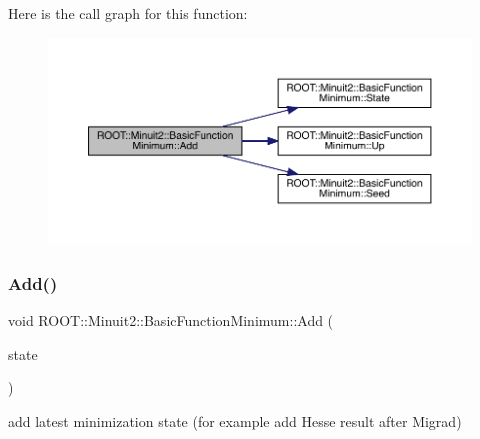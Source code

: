 Here is the call graph for this function\+:
\nopagebreak
\begin{figure}[H]
\begin{center}
\leavevmode
\includegraphics[width=350pt]{de/d25/classROOT_1_1Minuit2_1_1BasicFunctionMinimum_abd32f932e7a26883723b33c4a1402a85_cgraph}
\end{center}
\end{figure}
\mbox{\label{classROOT_1_1Minuit2_1_1BasicFunctionMinimum_abd32f932e7a26883723b33c4a1402a85}} 
\subsubsection{\texorpdfstring{Add()}{Add()}\hspace{0.1cm}{\footnotesize\ttfamily [3/3]}}
{\footnotesize\ttfamily void R\+O\+O\+T\+::\+Minuit2\+::\+Basic\+Function\+Minimum\+::\+Add (\begin{DoxyParamCaption}\item[{const \mbox{\hyperlink{classROOT_1_1Minuit2_1_1MinimumState}{Minimum\+State}} \&}]{state }\end{DoxyParamCaption})\hspace{0.3cm}{\ttfamily [inline]}}



add latest minimization state (for example add Hesse result after Migrad) 

